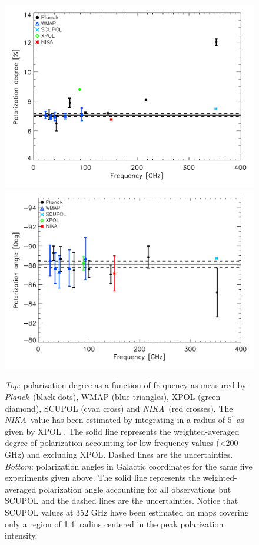 \documentclass[twocolumn,traditabstract]{aa}
\def\NIKA{\textit{NIKA}}
\def\Planck{\textit{Planck}}
\begin{document}
\begin{figure}
  \centering
          { \includegraphics[width=1\linewidth,keepaspectratio]{figures/pdegree_comparison.pdf}}
          { \includegraphics[width=1\linewidth,keepaspectratio]{figures/angle_comparison.pdf}} 
            \caption{{\it Top}: polarization degree as a function of frequency as measured by \Planck\ (black dots), WMAP (blue triangles), XPOL (green diamond), SCUPOL (cyan cross) and \NIKA\ (red crosses). The \NIKA\ value has been estimated by integrating in a radius of $5^{\prime}$ as given by XPOL \citep{aumont2010}. The solid line represents the weighted-averaged degree of polarization accounting for low frequency values (\textless 200 GHz) and excluding XPOL.
            Dashed lines are the uncertainties.
            {\it Bottom}: polarization angles in Galactic coordinates for the same five experiments given above. The solid line represents the weighted-averaged polarization angle accounting for all observations but SCUPOL and the dashed lines are the uncertainties.
Notice that SCUPOL values \citep{scubapol} at 352 GHz have been estimated on maps covering only a region of 1.4$^\prime$ radius centered in the peak polarization intensity.}
\label{crab_p_angle_comparison}		
  \end{figure}
\end{document}
